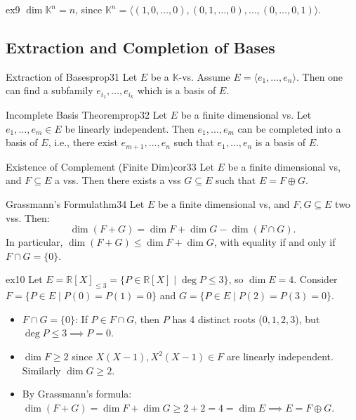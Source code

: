 \documentclass[11pt, a4paper]{article}
\newcommand{\R}{\mathbb{R}}
\newcommand{\K}{\mathbb{K}}
\begin{document}
\begin{example}{}{ex9}
  $\dim \K^n = n$, since $\K^n = \langle (1,0,\dots,0), (0,1,\dots,0), \dots, (0,\dots,0,1) \rangle$.
\end{example}

\subsection{Extraction and Completion of Bases}

\begin{proposition}{Extraction of Bases}{prop31}
  Let $E$ be a $\K$-vs. Assume $E = \langle e_1, \dots, e_n \rangle$. Then one can find a subfamily $e_{i_1}, \dots, e_{i_k}$ which is a basis of $E$.
\end{proposition}

\begin{proposition}{Incomplete Basis Theorem}{prop32}
  Let $E$ be a finite dimensional vs. Let $e_1, \dots, e_m \in E$ be linearly independent. Then $e_1, \dots, e_m$ can be completed into a basis of $E$, i.e., there exist $e_{m+1}, \dots, e_n$ such that $e_1, \dots, e_n$ is a basis of $E$.
\end{proposition}

\begin{corollary}{Existence of Complement (Finite Dim)}{cor33}
  Let $E$ be a finite dimensional vs, and $F \subseteq E$ a vss. Then there exists a vss $G \subseteq E$ such that $E = F \oplus G$.
\end{corollary}

\begin{theorem}{Grassmann's Formula}{thm34}
  Let $E$ be a finite dimensional vs, and $F, G \subseteq E$ two vss. Then:
  \[
    \dim(F + G) = \dim F + \dim G - \dim(F \cap G).
  \]
  In particular, $\dim(F + G) \le \dim F + \dim G$, with equality if and only if $F \cap G = \{0\}$.
\end{theorem}

\begin{example}{}{ex10}
  Let $E = \R[X]_{\le 3} = \{P \in \R[X] \mid \deg P \le 3\}$, so $\dim E = 4$.
  Consider $F = \{P \in E \mid P(0) = P(1) = 0\}$ and $G = \{P \in E \mid P(2) = P(3) = 0\}$.
  \begin{itemize}
    \item $F \cap G = \{0\}$: If $P \in F \cap G$, then $P$ has 4 distinct roots ($0,1,2,3$), but $\deg P \le 3 \implies P = 0$.
    \item $\dim F \ge 2$ since $X(X-1), X^2(X-1) \in F$ are linearly independent. Similarly $\dim G \ge 2$.
    \item By Grassmann's formula: $\dim(F + G) = \dim F + \dim G \ge 2 + 2 = 4 = \dim E \implies E = F \oplus G$.
  \end{itemize}
\end{example}
\end{document}
